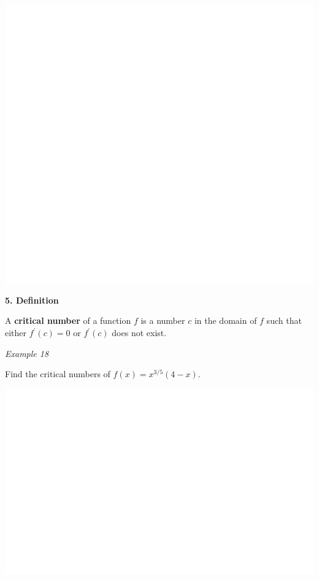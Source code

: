 \documentclass[]{book}
\begin{document}
\begin{center}\includegraphics[width=1\linewidth]{figure/LB32-1} \end{center}

\textbf{5. Definition}

A \textbf{critical number} of a function \(f\) is a number \(c\) in the domain of \(f\) such that either \(f^\prime(c) = 0\) or \(f^\prime(c)\) does not exist.

\emph{Example 18}

Find the critical numbers of \(f(x)=x^{3/5}(4-x).\)

\begin{center}\includegraphics[width=1\linewidth]{figure/LB33-1} \end{center}
\end{document}
